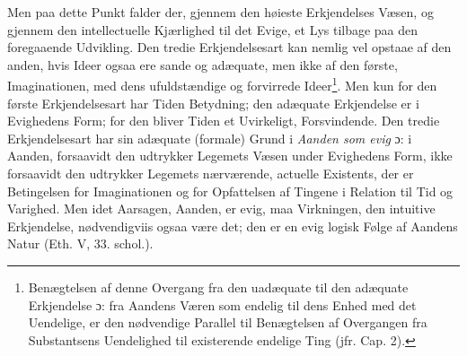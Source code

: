 \documentclass[12pt,a4paper]{book}
\begin{document}
Men paa dette Punkt falder der, gjennem den høieste
Erkjendelses Væsen, og gjennem den intellectuelle Kjærlighed
til det Evige, et Lys tilbage paa den foregaaende Udvikling.
Den tredie Erkjendelsesart kan nemlig vel opstaae
af den anden, hvis Ideer ogsaa ere sande og adæquate,
men ikke af den første, Imaginationen, med dens ufuldstændige
og forvirrede Ideer\footnote{Benægtelsen af denne Overgang fra den uadæquate til den adæquate
Erkjendelse ɔ: fra Aandens Væren som endelig til dens Enhed med
det Uendelige, er den nødvendige Parallel til Benægtelsen af Overgangen
fra Substantsens Uendelighed til existerende endelige Ting
(jfr. Cap. 2).}. Men kun for den første
Erkjendelsesart har Tiden Betydning; den adæquate Erkjendelse
er i Evighedens Form; for den bliver Tiden et
Uvirkeligt, Forsvindende. Den tredie Erkjendelsesart har sin
adæquate (formale) Grund i \emph{Aanden som evig} ɔ: i Aanden,
forsaavidt den udtrykker Legemets Væsen under Evighedens
Form, ikke forsaavidt den udtrykker Legemets nærværende,
actuelle Existents, der er Betingelsen for Imaginationen og
for Opfattelsen af Tingene i Relation til Tid og Varighed.
Men idet Aarsagen, Aanden, er evig, maa Virkningen, den
intuitive Erkjendelse, nødvendigviis ogsaa være det; den er
en evig logisk Følge af Aandens Natur (Eth. V, 33. schol.).
\end{document}
